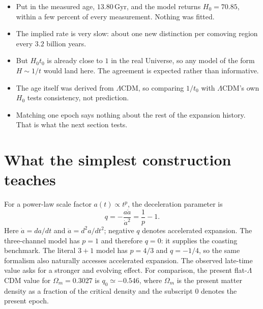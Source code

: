 \documentclass[10pt]{article}
\newenvironment{persuasions}
  {\begin{cpbox}\small\setlength{\parskip}{0pt}%
   {\footnotesize\bfseries\color{accent}%
    \textls[110]{CONCEPTUAL PERSUASIONS}}\par\vspace{3pt}%
   \begin{itemize}[leftmargin=1.15em,itemsep=2.5pt,topsep=0pt,parsep=0pt,
                   label=\textcolor{accent}{\scriptsize$\blacktriangleright$}]}
  {\end{itemize}\end{cpbox}}
\begin{document}
\begin{persuasions}
\item Put in the measured age, $13.80\,\mathrm{Gyr}$, and the model returns
$H_0=70.85$, within a few percent of every measurement.  Nothing was fitted.
\item The implied rate is very slow: about one new distinction per comoving
region every $3.2$ billion years.
\item But $H_0t_0$ is already close to $1$ in the real Universe, so any model
of the form $H\sim1/t$ would land here.  The agreement is expected rather than
informative.
\item The age itself was derived from $\Lambda$CDM, so comparing $1/t_0$ with
$\Lambda$CDM's own $H_0$ tests consistency, not prediction.
\item Matching one epoch says nothing about the rest of the expansion history.
That is what the next section tests.
\end{persuasions}

\section*{What the simplest construction teaches}

For a power-law scale factor $a(t)\propto t^p$, the deceleration parameter is
\begin{equation}
q=-\frac{a\ddot a}{\dot a^2}=\frac{1}{p}-1.
\end{equation}
Here $\dot a=d a/dt$ and $\ddot a=d^2a/dt^2$; negative $q$ denotes accelerated
expansion.
The three-channel model has $p=1$ and therefore $q=0$: it supplies the coasting
benchmark.  The literal $3+1$ model has $p=4/3$ and $q=-1/4$, so the same
formalism also naturally accesses accelerated expansion.  The observed
late-time value asks for a stronger and evolving effect.  For comparison, the
present flat-$\Lambda$CDM value for
$\Omega_m=0.3027$ is $q_0\simeq-0.546$, where $\Omega_m$ is the present matter
density as a fraction of the critical density and the subscript $0$ denotes
the present epoch.
\end{document}

